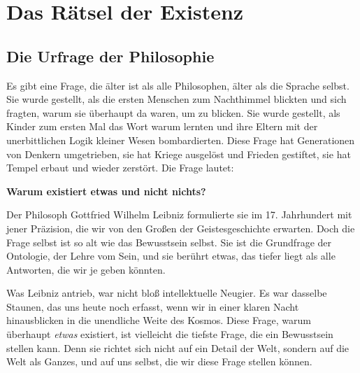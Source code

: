 
\chapter{Das Rätsel der Existenz}

\section{Die Urfrage der Philosophie}

Es gibt eine Frage, die älter ist als alle Philosophen, älter als die Sprache selbst. Sie wurde gestellt, als die ersten Menschen zum Nachthimmel blickten und sich fragten, warum sie überhaupt da waren, um zu blicken. Sie wurde gestellt, als Kinder zum ersten Mal das Wort \glqq warum\grqq{} lernten und ihre Eltern mit der unerbittlichen Logik kleiner Wesen bombardierten. Diese Frage hat Generationen von Denkern umgetrieben, sie hat Kriege ausgelöst und Frieden gestiftet, sie hat Tempel erbaut und wieder zerstört. Die Frage lautet:

\textbf{Warum existiert etwas und nicht nichts?}

Der Philosoph Gottfried Wilhelm Leibniz formulierte sie im 17. Jahrhundert mit jener Präzision, die wir von den Großen der Geistesgeschichte erwarten. Doch die Frage selbst ist so alt wie das Bewusstsein selbst. Sie ist die Grundfrage der Ontologie, der Lehre vom Sein, und sie berührt etwas, das tiefer liegt als alle Antworten, die wir je geben könnten.

Was Leibniz antrieb, war nicht bloß intellektuelle Neugier. Es war dasselbe Staunen, das uns heute noch erfasst, wenn wir in einer klaren Nacht hinausblicken in die unendliche Weite des Kosmos. Diese Frage, warum überhaupt \emph{etwas} existiert, ist vielleicht die tiefste Frage, die ein Bewusstsein stellen kann. Denn sie richtet sich nicht auf ein Detail der Welt, sondern auf die Welt als Ganzes, und auf uns selbst, die wir diese Frage stellen können.

